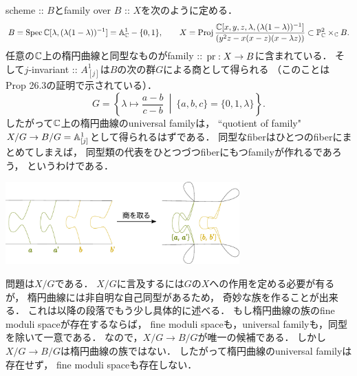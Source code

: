 \documentclass[a4paper]{jsarticle}
\begin{document}
    \begin{Example}
        scheme :: $B$とfamily over $B$ :: $X$を次のように定める．
        \[
            B=\operatorname{Spec} \mathbb{C}[\lambda, (\lambda(1-\lambda))^{-1}] =\mathbb{A}_{\mathbb{C}}^1-\{0,1\},
            \qquad
            X=\operatorname{Proj} \frac{\mathbb{C}[x,y,z, \lambda, (\lambda(1-\lambda))^{-1}]}{(y^2z-x(x-z)(x-\lambda z))}
            \subset \mathbb{P}^2_{\mathbb{C}} \times_{\mathbb{C}} B.
        \]
        任意の$\mathbb{C}$上の楕円曲線と同型なものがfamily :: $\operatorname{pr}: X \to B$に含まれている．
        そして$j$-invariant :: $A^1_{[j]}$は$B$の次の群$G$による商として得られる
        （このことは\cite{HarDef} Prop 26.3の証明で示されている）．
        \[ G=\left\{ \lambda \mapsto \frac{a-b}{c-b} ~\middle|~ \{a,b,c\}=\{0,1,\lambda\} \right\}. \]
        したがって$\mathbb{C}$上の楕円曲線のuniversal familyは，
        ``quotient of family" $X/G \to B/G=\mathbb{A}^1_{[j]}$として得られるはずである．
        同型なfiberはひとつのfiberにまとめてしまえば，
        同型類の代表をひとつづつfiberにもつfamilyが作れるであろう，
        というわけである．
        \begin{center}
            \includegraphics[width=9cm,pagebox=cropbox]{./images/quotient_of_family.pdf}
        \end{center}

        問題は$X/G$である．
        $X/G$に言及するには$G$の$X$への作用を定める必要が有るが，
        楕円曲線には非自明な自己同型があるため，
        奇妙な族を作ることが出来る．
        これは以降の段落でもう少し具体的に述べる．
        もし楕円曲線の族のfine moduli spaceが存在するならば，
        fine moduli spaceも，universal familyも，同型を除いて一意である．
        なので，$X/G \to B/G$が唯一の候補である．
        しかし$X/G \to B/G$は楕円曲線の族ではない．
        したがって楕円曲線のuniversal familyは存在せず，
        fine moduli spaceも存在しない．


\end{Example}
\end{document}

